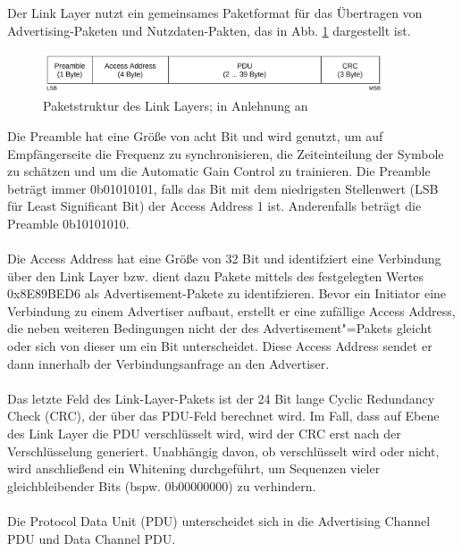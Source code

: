 Der Link Layer nutzt ein gemeinsames Paketformat für das Übertragen von Advertising-Paketen und Nutzdaten-Pakten, das in Abb. \ref{fig: ll paket struktur} dargestellt ist.\\

\begin{figure}[H]
    \centering
    \includegraphics[width=0.9\textwidth]{graphics/link_layer_packetformat.pdf}
    \caption[Paketstruktur des Link Layers]{Paketstruktur des Link Layers; in Anlehnung an \cite{BtSpec4.0_fig_2200}}
    \label{fig: ll paket struktur}
\end{figure}

Die Preamble hat eine Größe von acht Bit und wird genutzt, um auf Empfängerseite die Frequenz zu synchronisieren, die Zeiteinteilung der Symbole zu schätzen und um die Automatic Gain Control zu trainieren. Die Preamble beträgt immer 0b01010101, falls das Bit mit dem niedrigsten Stellenwert (LSB für Least Significant Bit) der Access Address 1 ist. Anderenfalls beträgt die Preamble 0b10101010. \cite{BtSpec4.0_2200-2201}
\\\\
Die Access Address hat eine Größe von 32 Bit und identifziert eine Verbindung über den Link Layer bzw. dient dazu Pakete mittels des festgelegten Wertes 0x8E89BED6 als Advertisement-Pakete zu identifzieren. Bevor ein Initiator eine Verbindung zu einem Advertiser aufbaut, erstellt er eine zufällige Access Address, die neben weiteren Bedingungen nicht der des Advertisement"=Pakets gleicht oder sich von dieser um ein Bit unterscheidet. Diese Access Address sendet er dann innerhalb der Verbindungsanfrage an den Advertiser. \cite{BtSpec4.0_2200-2201}
\\\\
Das letzte Feld des Link-Layer-Pakets ist der 24 Bit lange Cyclic Redundancy Check (CRC), der über das PDU-Feld berechnet wird. Im Fall, dass auf Ebene des Link Layer die PDU verschlüsselt wird, wird der CRC erst nach der Verschlüsselung generiert. Unabhängig davon, ob verschlüsselt wird oder nicht, wird anschließend ein Whitening \cite{BtSpec4.0_2217-2218} durchgeführt, um Sequenzen vieler gleichbleibender Bits (bspw. 0b00000000) zu verhindern. \cite{BtSpec4.0_2200-2201}
\\\\
Die Protocol Data Unit (PDU) unterscheidet sich in die Advertising Channel PDU und Data Channel PDU.

